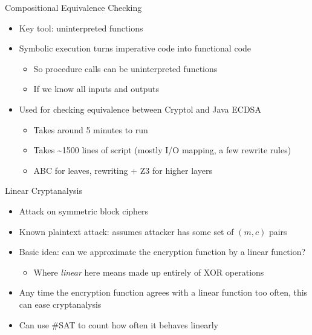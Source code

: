 \documentclass[ignorenonframetext,]{beamer}
\providecommand{\tightlist}{%
  \setlength{\itemsep}{0pt}\setlength{\parskip}{0pt}}
\begin{document}
\begin{frame}{Compositional Equivalence Checking}

\begin{itemize}
\tightlist
\item
  Key tool: uninterpreted functions
\item
  Symbolic execution turns imperative code into functional code

  \begin{itemize}
  \tightlist
  \item
    So procedure calls can be uninterpreted functions
  \item
    \alert{If} we know all inputs and outputs
  \end{itemize}
\item
  Used for checking equivalence between Cryptol and Java ECDSA

  \begin{itemize}
  \tightlist
  \item
    Takes around 5 minutes to run
  \item
    Takes \textasciitilde{}1500 lines of script (mostly I/O mapping, a
    few rewrite rules)
  \item
    ABC for leaves, rewriting + Z3 for higher layers
  \end{itemize}
\end{itemize}

\end{frame}

\begin{frame}{Linear Cryptanalysis}

\begin{itemize}
\tightlist
\item
  Attack on symmetric block ciphers
\item
  Known plaintext attack: assumes attacker has some set of \((m, c)\)
  pairs
\item
  Basic idea: can we approximate the encryption function by a linear
  function?

  \begin{itemize}
  \tightlist
  \item
    Where \emph{linear} here means made up entirely of XOR operations
  \end{itemize}
\item
  Any time the encryption function agrees with a linear function too
  often, this can ease cryptanalysis
\item
  Can use \#SAT to count how often it behaves linearly
\end{itemize}

\end{frame}
\end{document}
